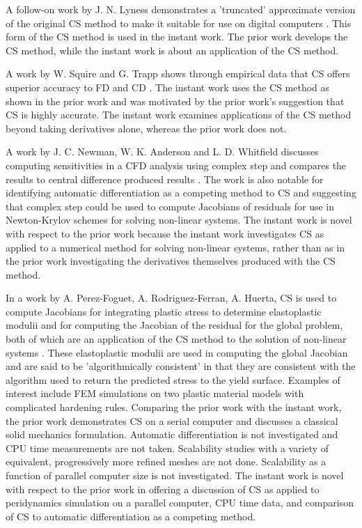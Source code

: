 \documentclass[preprint,12pt]{elsarticle}
\begin{document}
A follow-on work by J. N. Lyness demonstrates a 'truncated' approximate version
of the original CS method to make it suitable for use on digital computers \cite{lyness1968differentiation}.
This form of the CS method is used in the instant work.
The prior work develops the CS method, while the instant work is about an application of the CS method.

A work by W. Squire and G. Trapp shows through empirical data that CS offers superior accuracy
to FD and CD \cite{squire1998using}. The instant work uses the CS method as shown in the
prior work and was motivated by the prior work's suggestion that CS is highly accurate. 
The instant work examines applications of the CS method beyond taking derivatives alone,
whereas the prior work does not. 

A work by J. C. Newman, W. K. Anderson and L. D. Whitfield discusses computing
sensitivities in a CFD analysis using complex step and compares the results to
central difference produced results \cite{newman1998}. The work is also notable
for identifying automatic differentiation as a competing method to CS and
suggesting that complex step could be used to compute Jacobians of residuals
for use in Newton-Krylov schemes for solving non-linear systems. The instant
work is novel with respect to the prior work because the instant work
investigates CS as applied to a numerical method for solving non-linear
systems, rather than as in the prior work investigating the derivatives
themselves produced with the CS method.

In a work by A. Perez-Foguet, A. Rodriguez-Ferran, A. Huerta, CS is used to
compute Jacobians for integrating plastic stress to determine
elastoplastic modulii and for computing the Jacobian of the residual for the global
problem, both of which are an application of the CS method to the solution of
non-linear systems \cite{perez2000numerical}. These elastoplastic modulii are
used in computing the global Jacobian  and are said to be 'algorithmically
consistent' in that they are consistent with the algorithm used to return the
predicted stress to the yield surface. Examples of interest include FEM
simulations on two plastic material models with complicated hardening rules.
Comparing the prior work with the instant work, the prior work demonstrates CS
on a serial computer and discusses a classical solid mechanics formulation.
Automatic differentiation is not investigated and CPU time measurements are not
taken. Scalability studies with a variety of equivalent, progressively more
refined meshes are not done. Scalability as a function of parallel computer
size is not investigated. The instant work is novel with respect to the prior work in
offering a discussion of CS as applied to peridynamics simulation on a parallel
computer, CPU time data, and comparison of CS to automatic differentiation as a competing method. 
\end{document}
